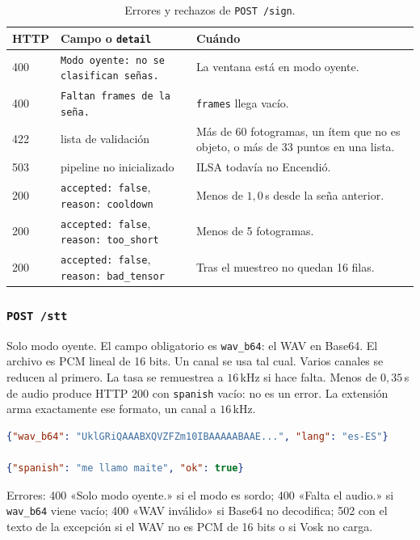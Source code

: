 \begin{table}[H]
  \centering
  \caption{Errores y rechazos de \texttt{POST /sign}.}
  \label{tab:api-local-sign-err}
  \small
  \begin{tabularx}{\textwidth}{@{}l l >{\raggedright\arraybackslash}X@{}}
    \toprule
    \textbf{HTTP} & \textbf{Campo o \texttt{detail}} & \textbf{Cuándo} \\
    \midrule
    400 & \texttt{Modo oyente: no se clasifican señas.} & La ventana está en modo oyente. \\
    400 & \texttt{Faltan frames de la seña.} & \texttt{frames} llega vacío. \\
    422 & lista de validación & Más de 60 fotogramas, un ítem que no es objeto, o más de 33 puntos en una lista. \\
    503 & pipeline no inicializado & ILSA todavía no Encendió. \\
    200 & \texttt{accepted: false}, \texttt{reason: cooldown} & Menos de $1{,}0$\,s desde la seña anterior. \\
    200 & \texttt{accepted: false}, \texttt{reason: too\_short} & Menos de 5 fotogramas. \\
    200 & \texttt{accepted: false}, \texttt{reason: bad\_tensor} & Tras el muestreo no quedan 16 filas. \\
    \bottomrule
  \end{tabularx}
\end{table}

\subsubsection{\texttt{POST /stt}}

Solo modo oyente. El campo obligatorio es \texttt{wav\_b64}: el WAV en Base64. El archivo es PCM lineal de 16 bits. Un canal se usa tal cual. Varios canales se reducen al primero. La tasa se remuestrea a $16$\,kHz si hace falta. Menos de $0{,}35$\,s de audio produce HTTP 200 con \texttt{spanish} vacío: no es un error. La extensión arma exactamente ese formato, un canal a $16$\,kHz.

\begin{lstlisting}[language=json]
{"wav_b64": "UklGRiQAAABXQVZFZm10IBAAAAABAAE...", "lang": "es-ES"}

{"spanish": "me llamo maite", "ok": true}
\end{lstlisting}

Errores: 400 «Solo modo oyente.» si el modo es sordo; 400 «Falta el audio.» si \texttt{wav\_b64} viene vacío; 400 «WAV inválido» si Base64 no decodifica; 502 con el texto de la excepción si el WAV no es PCM de 16 bits o si Vosk no carga.

